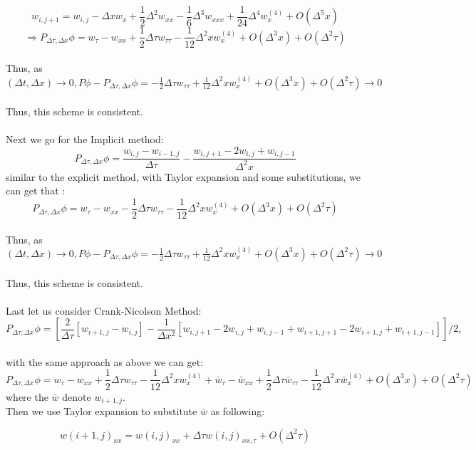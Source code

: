 \documentclass{article}
\begin{document}
$$
w_{i,j+1} = w_{i,j} - \Delta x w_x + \frac{1}{2} \Delta^2 w_{xx} - \frac{1}{6}\Delta^3 w_{xxx} + \frac{1}{24}\Delta^4 w^{(4)}_x + O(\Delta^5 x)
$$
$$
\Rightarrow P_{\Delta \tau, \Delta x}\phi = w_{\tau} - w_{xx} + \frac{1}{2}\Delta \tau w_{\tau \tau} - \frac{1}{12}\Delta^2 x w^{(4)}_x + O(\Delta^3 x) + O(\Delta^2 \tau)
$$\\
Thus, as $(\Delta t , \Delta x) \rightarrow 0, P\phi - P_{\Delta \tau, \Delta x}\phi = -\frac{1}{2}\Delta \tau w_{\tau \tau} + \frac{1}{12}\Delta^2 x w^{(4)}_x + O(\Delta^3 x) + O(\Delta^2 \tau) \rightarrow 0$\\\\
Thus, this scheme is consistent.\\\\
Next we go for the Implicit method:
$$
P_{\Delta \tau, \Delta x}\phi = \frac{w_{i,j} - w_{i-1,j}}{\Delta \tau} - \frac{w_{i,j+1} - 2w_{i,j} + w_{i,j-1}}{\Delta^2 x}
$$
similar to the explicit method, with Taylor expansion and some substitutions, we can get that :
$$
P_{\Delta \tau, \Delta x}\phi = w_{\tau} - w_{xx} - \frac{1}{2}\Delta \tau w_{\tau \tau} - \frac{1}{12}\Delta^2 x w^{(4)}_x + O(\Delta^3 x) + O(\Delta^2 \tau)
$$\\
Thus, as $(\Delta t , \Delta x) \rightarrow 0, P\phi - P_{\Delta \tau, \Delta x}\phi = -\frac{1}{2}\Delta \tau w_{\tau \tau} + \frac{1}{12}\Delta^2 x w^{(4)}_x + O(\Delta^3 x) + O(\Delta^2 \tau) \rightarrow 0$\\\\
Thus, this scheme is consistent.\\\\
Last let us consider Crank-Nicolson Method:
$$
P_{\Delta \tau, \Delta x}\phi = [\frac{2}{\Delta \tau}[w_{i+1,j} - w_{i,j}]- \frac{1}{\Delta x^2}[w_{i,j+1}-2w_{i,j}+w_{i,j-1}+w_{i+1,j+1} - 2w_{i+1,j}+w_{i+1,j-1}]]/2,
$$\\
with the same approach as above we can get:
$$
P_{\Delta \tau, \Delta x}\phi =  w_{\tau} - w_{xx} + \frac{1}{2}\Delta \tau w_{\tau \tau} - \frac{1}{12}\Delta^2 x w^{(4)}_x +  \bar{w}_{\tau} - \bar{w}_{xx} + \frac{1}{2}\Delta \tau \bar{w}_{\tau \tau} - \frac{1}{12}\Delta^2 x \bar{w}^{(4)}_x + O(\Delta^3 x) + O(\Delta^2 \tau)
$$
where the $\bar{w}$ denote $w_{i+1,j}$.\\
Then we use Taylor expansion to substitute $\bar{w}$ as following:

$$
w(i+1,j)_{xx} = w(i, j)_{xx} + \Delta \tau w(i, j)_{xx, \tau} + O(\Delta^2 \tau)
$$
\end{document}
